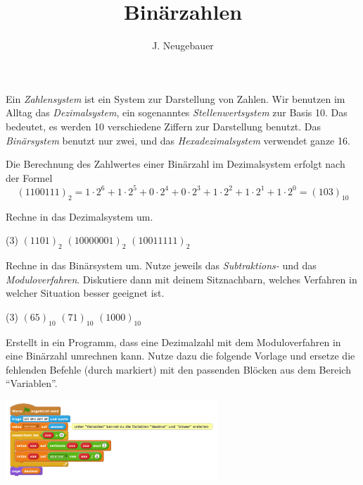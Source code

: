 \documentclass[10pt, a4paper]{scrartcl}
\author{J. Neugebauer}
\title{Binärzahlen}
\date{\Heute}
\begin{document}
\ReiheTitel

Ein \emph{Zahlensystem} ist ein System zur Darstellung von Zahlen. Wir benutzen im Alltag das \emph{Dezimalsystem}, ein sogenanntes \emph{Stellenwertsystem} zur Basis 10. Das bedeutet, es werden 10 verschiedene Ziffern zur Darstellung benutzt. Das \emph{Binärsystem} benutzt nur zwei, und das \emph{Hexadezimalsystem} verwendet ganze 16.

Die Berechnung des Zahlwertes einer Binärzahl im Dezimalsystem erfolgt nach der Formel
\[ (1100111)_2 = 1\cdot 2^6 + 1\cdot 2^5 + 0\cdot 2^4 + 0\cdot 2^3 + 1\cdot 2^2 + 1\cdot 2^1 + 1\cdot 2^0 = (103)_{10} \]

\begin{aufgabe}[symbol=\Large\symHeft]
	Rechne in das Dezimalsystem um.
	\begin{tasks}(3)
		\task $(1101)_2$
		\task $(1000 0001)_2$
		\task $(1001 1111)_2$
	\end{tasks}
\end{aufgabe}

\begin{aufgabe}[symbol=\Large\symHeft\yspace\symPartner]
	Rechne in das Binärsystem um. Nutze jeweils das \emph{Subtraktions-} und das \emph{Moduloverfahren}. Diskutiere dann mit deinem Sitznachbarn, welches Verfahren in welcher Situation besser geeignet ist.
	\begin{tasks}(3)
		\task $(65)_{10}$
		\task $(71)_{10}$
		\task $(1000)_{10}$
	\end{tasks}
\end{aufgabe}

\begin{aufgabe}[symbol=\Large\symLaptop\yspace\symPartner]
	Erstellt in  ein Programm, dass eine Dezimalzahl mit dem Moduloverfahren in eine Binärzahl umrechnen kann. Nutze dazu die folgende Vorlage und ersetze die fehlenden Befehle (durch  markiert) mit den passenden Blöcken aus dem Bereich \enquote{Variablen}.
	\begin{center}
	\includegraphics[width=8cm]{9Diff-AB.II.3-Abb_ScratchDezBin}
	\end{center}
\end{aufgabe}
\end{document}
